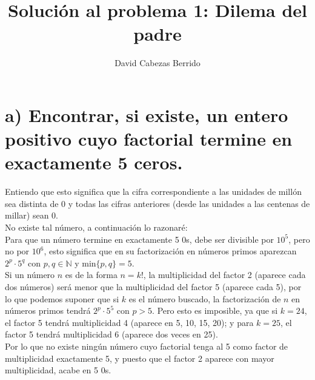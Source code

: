 \documentclass[12pt,spanish]{article}
\begin{document}
\title{Solución al problema 1: Dilema del padre}
\author{David Cabezas Berrido}
\date{\vspace{-5mm}}
\maketitle

\section{a) Encontrar, si existe, un entero positivo cuyo factorial termine en exactamente 5 ceros.}

Entiendo que esto significa que la cifra correspondiente a las
unidades de millón sea distinta de 0 y todas las cifras anteriores
(desde las unidades a las centenas de millar) sean 0. \\

No existe tal número, a continuación lo razonaré: \\

Para que un número termine en exactamente 5 0s, debe ser divisible por
$10^5$, pero no por $10^6$, esto significa que en su factorización en
números primos aparezcan $2^p\cdot 5^q$ con $p,q \in \mathbb{N}$ y min$\{p,q\}=5$. \\

Si un número $n$ es de la forma $n=k!$, la multiplicidad del factor 2
(aparece cada dos números) será menor que la multiplicidad del factor
5 (aparece cada 5), por lo que podemos suponer que si $k$ es el número
buscado, la factorización de $n$ en números primos tendrá
$2^p\cdot 5^5$ con $p>5$. Pero esto es imposible, ya que si $k=24$, el
factor 5 tendrá multiplicidad 4 (aparece en 5, 10, 15, 20); y para
$k=25$, el factor 5 tendrá multiplicidad 6 (aparece dos veces en 25). \\

Por lo que no existe ningún número cuyo factorial tenga al 5 como
factor de multiplicidad exactamente 5, y puesto que el factor 2
aparece con mayor multiplicidad, acabe en 5 0s.
\end{document}
